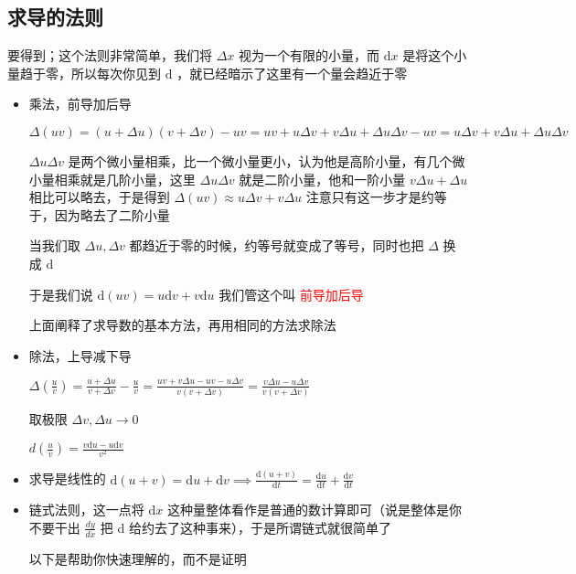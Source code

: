 \documentclass[lang=cn,newtx,10pt,scheme=chinese]{elegantbook}
\begin{document}
\subsection{求导的法则}


要得到；这个法则非常简单，我们将 $\Delta x$ 视为一个有限的小量，而 $\mathrm{d}x$ 是将这个小量趋于零，所以每次你见到 $\mathrm{d}$ ，就已经暗示了这里有一个量会趋近于零 

\begin{itemize}

  \item 乘法，前导加后导
  
  $\Delta(uv)=(u+\Delta u)(v+\Delta v)-uv=uv+u \Delta v+v \Delta u+ \Delta u \Delta v - uv =u \Delta v+v \Delta u+ \Delta u \Delta v$
  
  $\Delta u \Delta v$ 是两个微小量相乘，比一个微小量更小，认为他是高阶小量，有几个微小量相乘就是几阶小量，这里 $\Delta u \Delta v$ 就是二阶小量，他和一阶小量 $v \Delta u+ \Delta u$ 相比可以略去，于是得到 $\Delta(uv)\approx u \Delta v+v \Delta u $ 注意只有这一步才是约等于，因为略去了二阶小量

  当我们取 $\Delta u ,\Delta v $ 都趋近于零的时候，约等号就变成了等号，同时也把 $\Delta$ 换成 $\mathrm{d}$

  于是我们说 $\mathrm{d} (uv)=u \mathrm{d} v+v\mathrm{d}u$ 我们管这个叫 \textcolor{red}{前导加后导}

  上面阐释了求导数的基本方法，再用相同的方法求除法

  \item 除法，上导减下导
  
  $\Delta \left( \frac{u}{v} \right) = \frac{u+\Delta u}{v+\Delta v}-\frac{u}{v}=\frac{uv+v \Delta u-uv-u \Delta v}{v(v+\Delta v)}=\frac{v \Delta u - u \Delta v}{v(v+\Delta v)}$

  取极限 ${\Delta v,\Delta u \to 0}$

  $d(\frac{u}{v})=\frac{v\mathrm{d}u-u\mathrm{d}v}{v^{2}}$
  
          \item 求导是线性的 $\mathrm{d}(u+v)=\mathrm{d}u+\mathrm{d}v\implies \frac{\mathrm{d}(u+v)}{\mathrm{d}t}=\frac{\mathrm{d}u}{\mathrm{d}t}+\frac{\mathrm{d}v}{\mathrm{d}t}$
          \item 链式法则，这一点将 $\mathrm{d}x$ 这种量整体看作是普通的数计算即可（说是整体是你不要干出 $\frac{dy}{dx}$ 把 d 给约去了这种事来），于是所谓链式就很简单了
          
          以下是帮助你快速理解的，而不是证明


\end{itemize}
\end{document}
